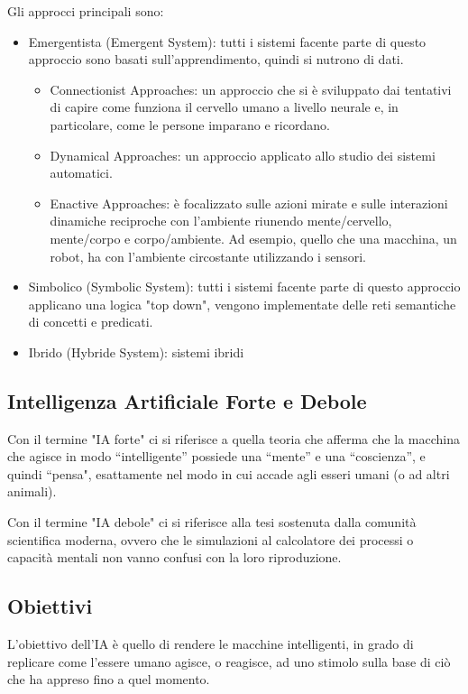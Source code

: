 Gli approcci principali sono:
\begin{itemize}
    \item Emergentista (Emergent System): tutti i sistemi facente parte di questo approccio sono basati sull'apprendimento, quindi si nutrono di dati.
    \begin{itemize}
        \item Connectionist Approaches: un approccio che si è sviluppato dai tentativi di capire come funziona il cervello umano a livello neurale e, in particolare, come le persone imparano e ricordano.
        \item Dynamical Approaches: un approccio applicato allo studio dei sistemi automatici.
        \item Enactive Approaches: è focalizzato sulle azioni mirate e sulle interazioni dinamiche reciproche con l'ambiente riunendo mente/cervello, mente/corpo e corpo/ambiente. Ad esempio, quello che una macchina, un robot, ha con l'ambiente circostante utilizzando i sensori.
    \end{itemize}
    \item Simbolico (Symbolic System): tutti i sistemi facente parte di questo approccio applicano una logica "top down", vengono implementate delle reti semantiche di concetti e predicati.
    \item Ibrido (Hybride System): sistemi ibridi
\end{itemize}

\subsection{Intelligenza Artificiale Forte e Debole}
Con il termine "IA forte" ci si riferisce a quella teoria che afferma che la macchina che agisce in modo “intelligente” possiede una “mente” e una “coscienza”, e quindi “pensa", esattamente nel modo in cui accade agli esseri umani (o ad altri animali).

Con il termine "IA debole" ci si riferisce alla tesi sostenuta dalla comunità scientifica moderna, ovvero che le simulazioni al calcolatore dei processi o capacità mentali non vanno confusi con la loro riproduzione.

\subsection{Obiettivi}
L'obiettivo dell'IA è quello di rendere le macchine intelligenti, in grado di replicare come l'essere umano agisce, o reagisce, ad uno stimolo sulla base di ciò che ha appreso fino a quel momento. 

